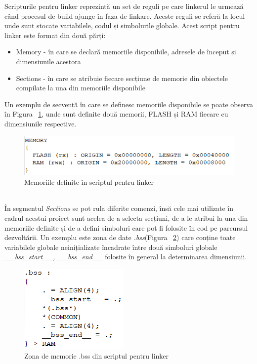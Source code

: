 \documentclass[12pt,a4paper]{report}
\begin{document}
Scripturile pentru linker reprezintă un set de reguli pe care linkerul le urmează când procesul de build ajunge în faza de linkare. Aceste reguli se referă la locul unde sunt stocate variabilele, codul și simbolurile globale. Acest script pentru linker este format din două părți:
\begin{itemize}
\item{Memory - în care se declară memoriile disponibile, adresele de început și dimensiunile acestora}
\item{Sections - în care se atribuie fiecare secțiune de memorie din obiectele compilate la una din memoriile disponibile}
\end{itemize}
Un exemplu de secvență în care se definesc memoriile disponibile se poate observa în Figura ~\ref{fig:scriptmemory}, unde sunt definite două memorii, FLASH și RAM fiecare cu dimensiunile respective.
\begin{figure}[h]
\centering
\includegraphics[scale=0.9]{pics/scriptmemory.png}
  \caption{Memoriile definite în scriptul pentru linker}
  \label{fig:scriptmemory}
\end{figure}\\
În segmentul \textit{Sections} se pot rula diferite comenzi, însă cele mai utilizate în cadrul acestui proiect sunt acelea de a selecta secțiuni, de a le atribui la una din memoriile definite și de a defini simboluri care pot fi folosite în cod pe parcursul dezvoltării. Un exemplu este zona de date \textit{.bss}(Figura ~\ref{fig:bssscript}) care conține toate variabilele globale neinițializate încadrate între două simboluri globale \textit{\_\_bss\_start\_\_, \_\_bss\_end\_\_} folosite în general la determinarea dimensiunii.
\begin{figure}[h]
\centering
\includegraphics[scale=0.9]{pics/bss.png}
  \caption{Zona de memorie .bss din scriptul pentru linker}
  \label{fig:bssscript}
\end{figure}\\
\end{document}

